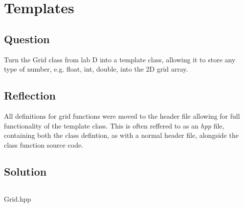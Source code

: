 \section{Templates}
    \subsection*{Question}
        Turn the Grid class from lab D into a template class, 
        allowing it to store any type of number, e.g. float, int, double, into the 2D grid array.

    \subsection*{Reflection}
        All definitions for grid functions were moved to the header file allowing for full
        functionality of the template class. 
        This is often reffered to as an \textit{hpp} file, 
        containing both the class defintion, as with a normal header file,
        alongside the class function source code.

    \subsection*{Solution}
        \begin{listing}[H]
            \inputminted[firstline=10, lastline=86]{cpp}{../Tasks/01-Templates/Grid.hpp}
            \caption{Grid.hpp}
        \end{listing}